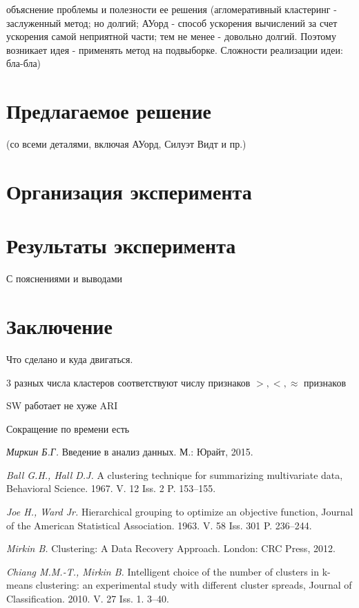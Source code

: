 \documentclass[12pt]{a&t}
\begin{document}
\newpage
объяснение проблемы и полезности ее решения (агломеративный кластеринг - заслуженный метод; но долгий; АУорд - способ ускорения вычислений за счет ускорения самой неприятной части; тем не менее - довольно долгий. Поэтому возникает идея - применять метод на подвыборке. Сложности реализации идеи: бла-бла)

\section{Предлагаемое решение}
(со всеми деталями, включая АУорд, Силуэт Видт и пр.)


\section{Организация эксперимента}

\section{Результаты эксперимента}
С пояснениями и выводами

\section{Заключение}

Что сделано и куда двигаться.
\begin{enumlist} %
	\item
	3 разных числа кластеров соответствуют числу признаков $ >,<,\approx $ признаков	
	\item
	SW работает не хуже ARI
	\item
	Сокращение по времени есть
\end{enumlist}

\begin{thebibliography}{10}


{\it Миркин Б.Г.}
Введение в анализ данных. М.: Юрайт, 2015.

{\it Ball G.H., Hall D.J.}
A clustering technique for summarizing multivariate data, Behavioral Science. 1967. V. 12 Iss. 2 P. 153--155.

{\it Joe H., Ward Jr.}
Hierarchical grouping to optimize an objective function, Journal of the American Statistical Association. 1963. V. 58 Iss. 301 P. 236--244.

{\it Mirkin B.}
Clustering: A Data Recovery Approach. London: CRC Press, 2012.

{\it Chiang M.M.-T., Mirkin B.}
Intelligent choice of the number of clusters in k-means clustering: an experimental study with different cluster spreads, Journal of Classification. 2010. V. 27 Iss. 1. 3--40.


\end{thebibliography}


\end{document}
